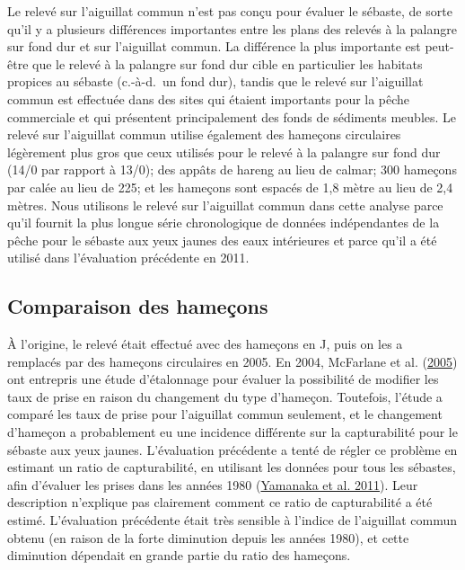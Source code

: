 \documentclass[french,11pt]{book}
\begin{document}
Le relevé sur l'aiguillat commun n'est pas conçu pour évaluer le sébaste, de sorte qu'il y a plusieurs différences importantes entre les plans des relevés à la palangre sur fond dur et sur l'aiguillat commun. La différence la plus importante est peut-être que le relevé à la palangre sur fond dur cible en particulier les habitats propices au sébaste (c.-à-d.~un fond dur), tandis que le relevé sur l'aiguillat commun est effectuée dans des sites qui étaient importants pour la pêche commerciale et qui présentent principalement des fonds de sédiments meubles. Le relevé sur l'aiguillat commun utilise également des hameçons circulaires légèrement plus gros que ceux utilisés pour le relevé à la palangre sur fond dur (14/0 par rapport à 13/0); des appâts de hareng au lieu de calmar; 300 hameçons par calée au lieu de 225; et les hameçons sont espacés de 1,8 mètre au lieu de 2,4 mètres. Nous utilisons le relevé sur l'aiguillat commun dans cette analyse parce qu'il fournit la plus longue série chronologique de données indépendantes de la pêche pour le sébaste aux yeux jaunes des eaux intérieures et parce qu'il a été utilisé dans l'évaluation précédente en 2011.

\hypertarget{sec:dog-hook-comparison}{%
\subsection{Comparaison des hameçons}\label{sec:dog-hook-comparison}}

À l'origine, le relevé était effectué avec des hameçons en J, puis on les a remplacés par des hameçons circulaires en 2005. En 2004, McFarlane et al. (\protect\hyperlink{ref-mcfarlane2005}{2005}) ont entrepris une étude d'étalonnage pour évaluer la possibilité de modifier les taux de prise en raison du changement du type d'hameçon. Toutefois, l'étude a comparé les taux de prise pour l'aiguillat commun seulement, et le changement d'hameçon a probablement eu une incidence différente sur la capturabilité pour le sébaste aux yeux jaunes. L'évaluation précédente a tenté de régler ce problème en estimant un ratio de capturabilité, en utilisant les données pour tous les sébastes, afin d'évaluer les prises dans les années 1980 (\protect\hyperlink{ref-yamanaka2011}{Yamanaka et al. 2011}). Leur description n'explique pas clairement comment ce ratio de capturabilité a été estimé. L'évaluation précédente était très sensible à l'indice de l'aiguillat commun obtenu (en raison de la forte diminution depuis les années 1980), et cette diminution dépendait en grande partie du ratio des hameçons.
\end{document}
